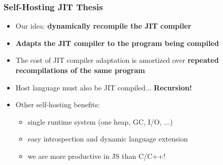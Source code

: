 \begin{frame}
\frametitle{\bf Self-Hosting JIT Thesis}

  \begin{itemize}

  \item Our idea: {\bf dynamically recompile the JIT compiler}
    \bigskip
    \bigskip

  \item {\bf Adapts the JIT compiler to the program being compiled}
    \smallskip

  \item The cost of JIT compiler adaptation is amortized over
    {\bf repeated recompilations of the same program}
    \smallskip

  \item Host language must also be JIT compiled... {\bf Recursion!}
    \bigskip

  \item Other self-hosting benefits:
    \begin{itemize}
      \item single runtime system (one heap, GC, I/O, ...)
      \item easy introspection and dynamic language extension
      \item we are more productive in JS than C/C++!
    \end{itemize}
    \smallskip

  \end{itemize}
\end{frame}

